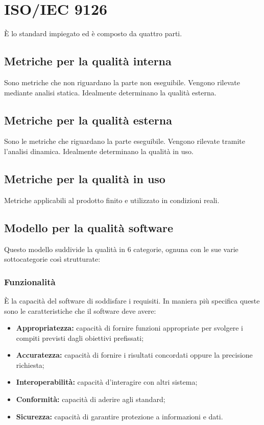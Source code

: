 \label{sec:A}
\section{ISO/IEC 9126}
È lo standard impiegato ed è composto da quattro parti.
\subsection{Metriche per la qualità interna}
Sono metriche che non riguardano la parte non eseguibile. Vengono rilevate mediante analisi statica. Idealmente determinano la qualità esterna.
\subsection{Metriche per la qualità esterna}
Sono le metriche che riguardano la parte eseguibile. Vengono rilevate tramite l'analisi dinamica. Idealmente determinano la qualità in uso.
\subsection{Metriche per la qualità in uso}
Metriche applicabili al prodotto finito e utilizzato in condizioni reali.
\subsection{Modello per la qualità software}
Questo modello suddivide la qualità in 6 categorie, ognuna con le sue varie sottocategorie così strutturate:
\subsubsection{Funzionalità}
È la capacità del software di soddisfare i requisiti. In maniera più specifica queste sono le caratteristiche che il software deve avere:
\begin{itemize}
    \item \textbf{Appropriatezza:} capacità di fornire funzioni appropriate per svolgere i compiti previsti dagli obiettivi prefissati;
    \item \textbf{Accuratezza:} capacità di fornire i risultati concordati oppure la precisione richiesta;
    \item \textbf{Interoperabilità:} capacità  d'interagire con altri sistema;
    \item \textbf{Conformità:} capacità di aderire agli standard;
    \item \textbf{Sicurezza:} capacità di garantire protezione a informazioni e dati.
\end{itemize}
